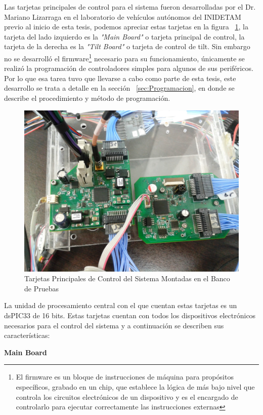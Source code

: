 Las tarjetas principales de control para el sistema fueron desarrolladas por el Dr. Mariano Lizarraga en el laboratorio de veh\'{i}culos aut\'{o}nomos del INIDETAM previo al inicio de esta tesis, podemos apreciar estas tarjetas en la figura ~\ref{fig:MainBoards}, la tarjeta del lado izquierdo es la \textit{"Main Board"} o tarjeta principal de control, la tarjeta de la derecha es la \textit{"Tilt Board"} o tarjeta de control de tilt. Sin embargo no se desarroll\'{o} el firmware\footnote{El firmware es un bloque de instrucciones de m\'{a}quina para prop\'{o}sitos espec\'{i}ficos, grabado en un chip, que establece la l\'{o}gica de m\'{a}s bajo nivel que controla los circuitos electr\'{o}nicos de un dispositivo y es el encargado de controlarlo para ejecutar correctamente las instrucciones externas} necesario para su funcionamiento, \'{u}nicamente se realiz\'{o} la programaci\'{o}n de controladores simples para algunos de sus perif\'{e}ricos. Por lo que esa tarea tuvo que llevarse a cabo como parte de esta tesis, este desarrollo se trata a detalle en la secci\'{o}n ~\ref{sec:Programacion}, en donde se describe el procedimiento y m\'{e}todo de programaci\'{o}n. 

\begin{figure}[H]
\centering
      \includegraphics[scale=0.1]{img/Mainboards.jpg}
      \caption{Tarjetas Principales de Control del Sistema Montadas en el Banco de Pruebas}
      \label{fig:MainBoards}
\end{figure} 

La unidad de procesamiento central con el que cuentan estas tarjetas es un dsPIC33 de 16 bits. Estas tarjetas cuentan con todos los dispositivos electr\'{o}nicos necesarios para el control del sistema y a continuaci\'{o}n se describen sus caracter\'{i}sticas:\newline
\begin{large}
\textbf{Main Board} 
\end{large}

